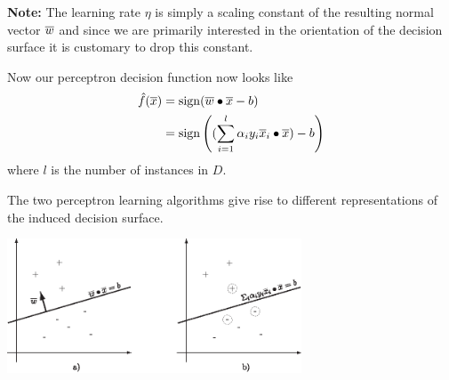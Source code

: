 \documentclass[a4paper,blends,pdf,colorBG,slideColor]{prosper}
\begin{document}
{\bf Note:} The learning rate $\eta$ is simply a scaling constant of the resulting 
normal vector $\overline{w}$ and since we are primarily interested in the orientation of the decision 
surface it is customary to drop this constant.
\es

Now our perceptron decision function now looks like
\begin{align*}
\model{f}(\ol{x}) &= \sign(\ol{w}\bullet\ol{x} - b)\\
&= \sign\left((\sum_{i=1}^l \alpha_i y_i \ol{x}_i\bullet\ol{x}) - b\right)
\end{align*}
where $l$ is the number of instances in $D$.
\es

\begin{center}
\end{center}
\es


The two perceptron learning algorithms give rise to different representations
of the induced decision surface.

\vspace{.5in}

\begin{center}
\includegraphics[height=40mm]{figures/fig05-05.eps}
 \end{center}
 \es
 
\end{document}
